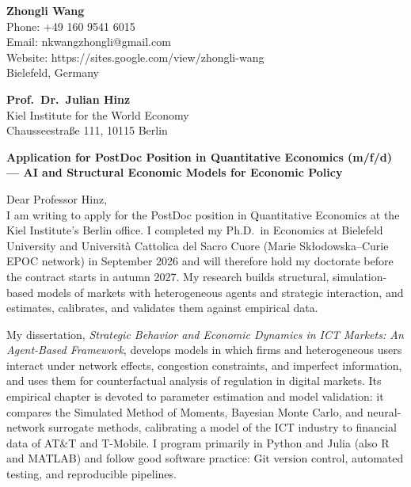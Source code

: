 \documentclass[11pt]{article}
\begin{document}
\noindent
\textbf{Zhongli Wang} \\
Phone: +49 160 9541 6015 \\
Email: nkwangzhongli@gmail.com \\
Website: https://sites.google.com/view/zhongli-wang \\
Bielefeld, Germany \\

\vspace{0.3cm}

\noindent
\textbf{Prof.\ Dr.\ Julian Hinz} \\
Kiel Institute for the World Economy \\
Chausseestraße 111, 10115 Berlin \\

\vspace{0.3cm}

\noindent
\textbf{Application for PostDoc Position in Quantitative Economics (m/f/d) --- AI and Structural Economic Models for Economic Policy}\\

\vspace{0.2cm}

\noindent Dear Professor Hinz,\\[0.15cm]

I am writing to apply for the PostDoc position in Quantitative Economics at the Kiel Institute's Berlin office. I completed my Ph.D.\ in Economics at Bielefeld University and Universit\`a Cattolica del Sacro Cuore (Marie Sk{\l}odowska--Curie EPOC network) in September 2026 and will therefore hold my doctorate before the contract starts in autumn 2027. My research builds structural, simulation-based models of markets with heterogeneous agents and strategic interaction, and estimates, calibrates, and validates them against empirical data.

My dissertation, \emph{Strategic Behavior and Economic Dynamics in ICT Markets: An Agent-Based Framework}, develops models in which firms and heterogeneous users interact under network effects, congestion constraints, and imperfect information, and uses them for counterfactual analysis of regulation in digital markets. Its empirical chapter is devoted to parameter estimation and model validation: it compares the Simulated Method of Moments, Bayesian Monte Carlo, and neural-network surrogate methods, calibrating a model of the ICT industry to financial data of AT\&T and T-Mobile. I program primarily in Python and Julia (also R and MATLAB) and follow good software practice: Git version control, automated testing, and reproducible pipelines.
\end{document}
